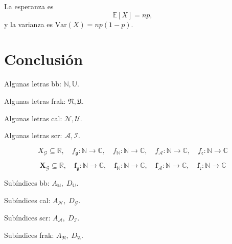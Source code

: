 La esperanza es
\begin{equation}
  \mathbb{E}[X] = np,
\end{equation}
y la varianza es $\mathrm{Var}(X) = np(1-p)$.

\lipsum[11-12]

\section{Conclusión}
\lipsum[13-14]

Algunas letras bb: $\mathbb{N},\mathbb{U}$. 

Algunas letras frak: $\mathfrak{N},\mathfrak{U}$. 

Algunas letras cal: $\mathcal{N},\mathcal{U}$. 

Algunas letras scr: $\mathscr{A},\mathscr{I}$.

\[
  X_{\mathcal{G}} \subseteq \mathbb{R},\quad
  f_{\mathfrak{g}} : \mathbb{N} \to \mathbb{C},\quad
  f_{\mathbb{N}} : \mathbb{N} \to \mathbb{C},\quad
  f_{\mathscr{A}} : \mathbb{N} \to \mathbb{C},\quad
  f_{\mathfrak{c}} : \mathbb{N} \to \mathbb{C}
\]

$$ \mathbf{ X_{\mathcal{G}} \subseteq \mathbb{R},\quad
  f_{\mathfrak{g}} : \mathbb{N} \to \mathbb{C},\quad
  f_{\mathbb{N}} : \mathbb{N} \to \mathbb{C},\quad
  f_{\mathscr{A}} : \mathbb{N} \to \mathbb{C},\quad
  f_{\mathfrak{c}} : \mathbb{N} \to \mathbb{C} }$$

Subíndices bb: $A_{\mathbb{N}},\; D_{\mathbb{U}}$.

Subíndices cal: $A_{\mathcal{N}},\; D_{\mathcal{G}}$.

Subíndices scr: $A_{\mathscr{A}},\; D_{\mathscr{I}}$.

Subíndices frak: $A_{\mathfrak{N}},\; D_{\mathfrak{A}}$.